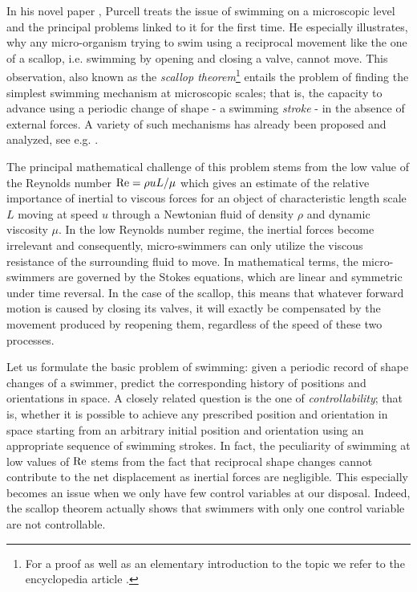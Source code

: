 
In his novel paper \cite{Purcell1977}, Purcell treats the issue of swimming on a microscopic level and the principal problems linked to it for the first time. He especially illustrates, why any micro-organism trying to swim using a reciprocal movement like the one of a scallop, i.e. swimming by opening and closing a valve, cannot move. This observation, also known as the \emph{scallop theorem}\footnote{For a proof as well as an elementary introduction to the topic we refer to the encyclopedia article \cite{DeSimone2011}.} entails the problem of finding the simplest swimming mechanism at microscopic scales; that is, the capacity to advance using a periodic change of  shape - a swimming \emph{stroke} - in  the absence of external forces. A variety of such mechanisms has already been proposed and analyzed, see e.g. \cite{Alouges2013, Najafi2004, Purcell1977}.


The principal mathematical challenge of this problem stems from the low value of the Reynolds number $\operatorname{Re} = \rho u L/\mu$ which gives an estimate of the relative importance of inertial to viscous forces for an object of characteristic length scale $L$ moving at speed $u$ through a Newtonian fluid of density $\rho$ and dynamic viscosity $\mu$. In the low Reynolds number regime, the inertial forces become irrelevant and consequently, micro-swimmers can only utilize the viscous resistance of the surrounding fluid to move. In mathematical terms, the micro-swimmers are governed by the Stokes equations, which are linear and symmetric under time reversal. In the case of the scallop, this means that whatever forward motion is caused by closing its valves, it will exactly be compensated by the movement produced by reopening them, regardless of the speed of these two processes.

Let us formulate the basic problem of swimming: given a periodic record of shape changes of a swimmer, predict the corresponding history of positions and orientations in space. A closely related question is the one of \emph{controllability}; that is, whether it is possible to achieve any prescribed position and orientation in space starting from an arbitrary initial position and orientation using an appropriate sequence of swimming strokes. In fact, the peculiarity of swimming at low values of $\operatorname{Re}$ stems from the fact that reciprocal shape changes cannot contribute to the net displacement as inertial forces are negligible. This especially becomes an issue when we only have few control variables at our disposal. Indeed, the scallop theorem actually shows that swimmers with only one control variable are not controllable.

